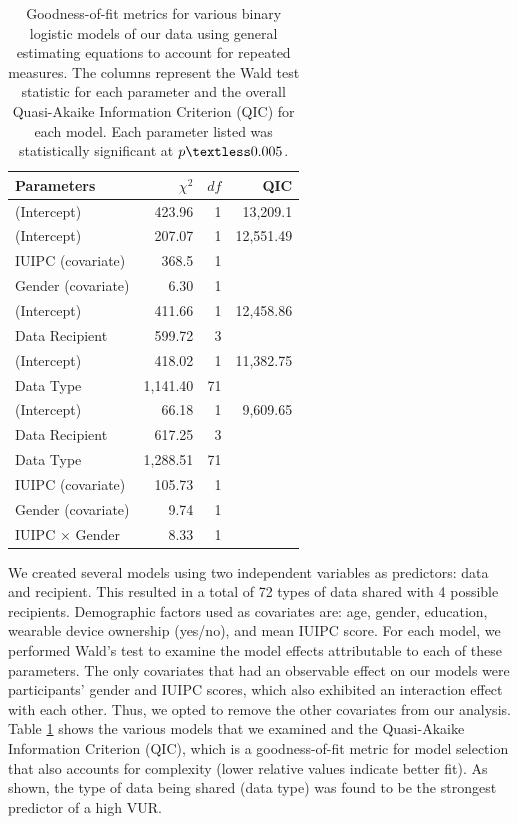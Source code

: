 \documentclass[conference]{IEEEtran}
\begin{document}
\begin{table}[t]
\centering
\begin{tabular}{|l| r| r| r|}
\hline
Parameters & $\chi^2$ & $df$ & QIC\\
\hline
\hline
(Intercept) & 423.96 & 1 & 13,209.1\\
\hline
(Intercept) & 207.07 & 1 & 12,551.49\\
IUIPC (covariate) & 368.5 & 1 & \\
Gender (covariate) & 6.30 & 1 & \\
\hline
(Intercept) & 411.66 & 1 &12,458.86\\
Data Recipient & 599.72 & 3 & \\
\hline
(Intercept) & 418.02 & 1 & 11,382.75\\
Data Type & 1,141.40 & 71 & \\
\hline
(Intercept) & 66.18 & 1 & 9,609.65 \\
Data Recipient & 617.25 & 3 & \\
Data Type & 1,288.51 & 71 & \\
IUIPC (covariate) & 105.73 & 1 & \\
Gender (covariate) & 9.74 & 1 & \\
IUIPC $\times$ Gender & 8.33 & 1 &\\
\hline
\end{tabular}
\caption{Goodness-of-fit metrics for various binary logistic models of our data using general estimating equations to account for repeated measures. The columns represent the Wald test statistic for each parameter and the overall Quasi-Akaike Information Criterion (QIC) for each model. Each parameter listed was statistically significant at $p\textless0.005$.}
\label{regression}
\end{table}

We created several models using two independent variables as predictors: data and recipient. This resulted in a total of 72 types of data shared with 4 possible recipients. Demographic factors used as covariates are: age, gender, education, wearable device ownership (yes/no), and mean IUIPC score. For each model, we performed Wald's test to examine the model effects attributable to each of these parameters. The only covariates that had an observable effect on our models were participants' gender and IUIPC scores, which also exhibited an interaction effect with each other. Thus, we opted to remove the other covariates from our analysis. Table \ref{regression} shows the various models that we examined and the Quasi-Akaike Information Criterion (QIC), which is a goodness-of-fit metric for model selection that also accounts for complexity (lower relative values indicate better fit). As shown, the type of data being shared (data type) was found to be the strongest predictor of a high VUR.
\end{document}
